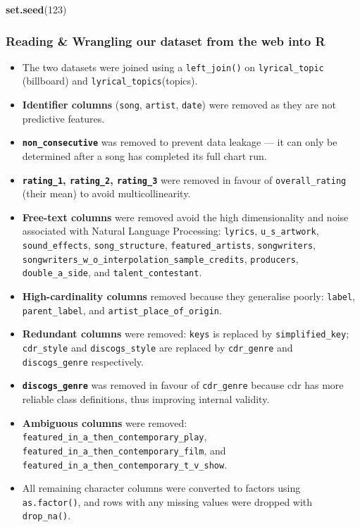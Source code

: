 \documentclass[
]{article}
\newenvironment{Shaded}{\begin{snugshade}}{\end{snugshade}}
\newcommand{\DecValTok}[1]{\textcolor[rgb]{0.00,0.00,0.81}{#1}}
\newcommand{\FunctionTok}[1]{\textcolor[rgb]{0.13,0.29,0.53}{\textbf{#1}}}
\newcommand{\NormalTok}[1]{#1}
\providecommand{\tightlist}{%
  \setlength{\itemsep}{0pt}\setlength{\parskip}{0pt}}
\begin{document}
\begin{Shaded}
\begin{Highlighting}[]
\FunctionTok{set.seed}\NormalTok{(}\DecValTok{123}\NormalTok{)}
\end{Highlighting}
\end{Shaded}

\subsubsection{Reading \& Wrangling our dataset from the web into
R}\label{reading-wrangling-our-dataset-from-the-web-into-r}

\begin{itemize}
\tightlist
\item
  The two datasets were joined using a \texttt{left\_join()} on
  \texttt{lyrical\_topic} (billboard) and
  \texttt{lyrical\_topics}(topics).
\item
  \textbf{Identifier columns} (\texttt{song}, \texttt{artist},
  \texttt{date}) were removed as they are not predictive features.
\item
  \textbf{\texttt{non\_consecutive}} was removed to prevent data leakage
  --- it can only be determined after a song has completed its full
  chart run.
\item
  \textbf{\texttt{rating\_1}, \texttt{rating\_2}, \texttt{rating\_3}}
  were removed in favour of \texttt{overall\_rating} (their mean) to
  avoid multicollinearity.
\item
  \textbf{Free-text columns} were removed avoid the high dimensionality
  and noise associated with Natural Language Processing:
  \texttt{lyrics}, \texttt{u\_s\_artwork}, \texttt{sound\_effects},
  \texttt{song\_structure}, \texttt{featured\_artists},
  \texttt{songwriters},
  \texttt{songwriters\_w\_o\_interpolation\_sample\_credits},
  \texttt{producers}, \texttt{double\_a\_side}, and
  \texttt{talent\_contestant}.
\item
  \textbf{High-cardinality columns} removed because they generalise
  poorly: \texttt{label}, \texttt{parent\_label}, and
  \texttt{artist\_place\_of\_origin}.
\item
  \textbf{Redundant columns} were removed: \texttt{keys} is replaced by
  \texttt{simplified\_key}; \texttt{cdr\_style} and
  \texttt{discogs\_style} are replaced by \texttt{cdr\_genre} and
  \texttt{discogs\_genre} respectively.
\item
  \textbf{\texttt{discogs\_genre}} was removed in favour of
  \texttt{cdr\_genre} because cdr has more reliable class definitions,
  thus improving internal validity.
\item
  \textbf{Ambiguous columns} were removed:
  \texttt{featured\_in\_a\_then\_contemporary\_play},
  \texttt{featured\_in\_a\_then\_contemporary\_film}, and
  \texttt{featured\_in\_a\_then\_contemporary\_t\_v\_show}.
\item
  All remaining character columns were converted to factors using
  \texttt{as.factor()}, and rows with any missing values were dropped
  with \texttt{drop\_na()}.
\end{itemize}
\end{document}
